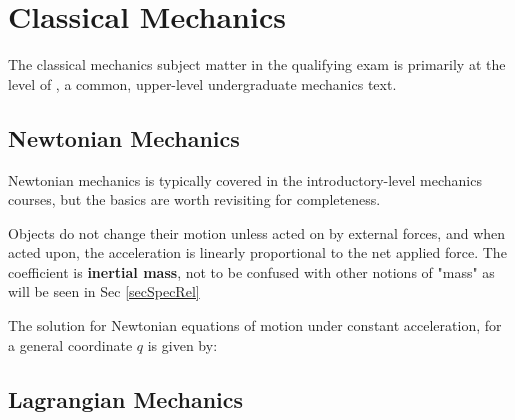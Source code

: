 \newpage
\section{Classical Mechanics}
\label{sec:classmech}
The classical mechanics subject matter in the qualifying exam is primarily at the level of \cite{thorntonClassicalDynamicsParticles2004}, a common, upper-level undergraduate mechanics text.


\subsection{Newtonian Mechanics}
Newtonian mechanics is typically covered in the introductory-level mechanics courses, but the basics are worth revisiting for completeness.

Objects do not change their motion unless acted on by external forces, and when acted upon, the acceleration is linearly proportional to the net applied force. The coefficient is \textbf{inertial mass}, not to be confused with other notions of "mass" as will be seen in Sec \ref{secSpecRel}


The solution for Newtonian equations of motion under constant acceleration, for a general coordinate $q$ is given by: 



\subsection{Lagrangian Mechanics}



